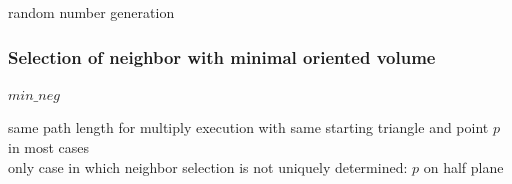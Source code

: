 \documentclass[10pt]{article}
\begin{document}
random number generation

\subsubsection{Selection of neighbor with minimal oriented volume}

$ min\_neg $

same path length for multiply execution with same starting triangle and point $p$ in most cases\\
only case in which neighbor selection is not uniquely determined: $p$ on half plane


\begin{figure}[h]
\end{figure}
\end{document}
